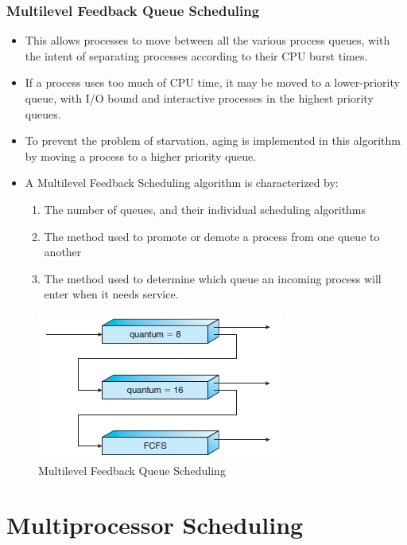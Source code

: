\documentclass{article}
\theoremstyle{plain}
\theoremstyle{definition}
\begin{document}
\subsubsection{Multilevel Feedback Queue Scheduling}
\begin{itemize}
    \item This allows processes to move between all the various process queues, with the intent of separating processes according to their CPU burst times. 
    
    \item If a process uses too much of CPU time, it may be moved to a lower-priority queue, with I/O bound and interactive processes in the highest priority queues. 
    
    \item To prevent the problem of starvation, aging is implemented in this algorithm by moving a process to a higher priority queue. 
    
    \item A Multilevel Feedback Scheduling algorithm is characterized by:
    \begin{enumerate}
        \item The number of queues, and their individual scheduling algorithms
        
        \item The method used to promote or demote a process from one queue to another
        
        \item The method used to determine which queue an incoming process will enter when it needs service. 
    \end{enumerate}
\end{itemize}
\begin{figure}[h]
    \centering
    \includegraphics{os21.png}
    \caption{Multilevel Feedback Queue Scheduling}
    \label{fig:my_label_xws}
\end{figure}


\section{Multiprocessor Scheduling}
\end{document}
